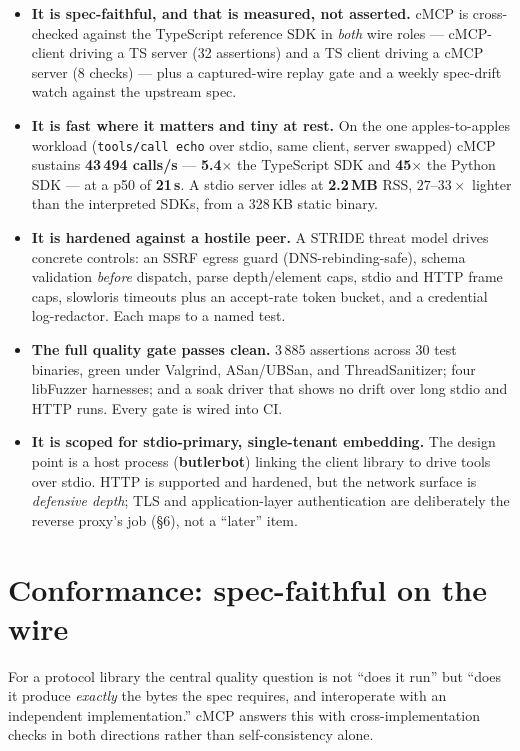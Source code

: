 \documentclass[10pt]{article}
\newcommand{\code}[1]{\texttt{\small #1}}
\begin{document}
\begin{itemize}
  \item \textbf{It is spec-faithful, and that is measured, not asserted.}
    cMCP is cross-checked against the TypeScript reference SDK in
    \emph{both} wire roles --- cMCP-client driving a TS server (32 assertions)
    and a TS client driving a cMCP server (8 checks) --- plus a captured-wire
    replay gate and a weekly spec-drift watch against the upstream spec.
  \item \textbf{It is fast where it matters and tiny at rest.} On the one
    apples-to-apples workload (\code{tools/call echo} over stdio, same client,
    server swapped) cMCP sustains \textbf{43\,494 calls/s} --- \textbf{5.4$\times$}
    the TypeScript SDK and \textbf{45$\times$} the Python SDK --- at a p50 of
    \textbf{21\,\textmu s}. A stdio server idles at \textbf{2.2\,MB} RSS, $27$--$33\times$
    lighter than the interpreted SDKs, from a 328\,KB static binary.
  \item \textbf{It is hardened against a hostile peer.} A STRIDE threat model
    drives concrete controls: an SSRF egress guard (DNS-rebinding-safe),
    schema validation \emph{before} dispatch, parse depth/element caps, stdio
    and HTTP frame caps, slowloris timeouts plus an accept-rate token bucket,
    and a credential log-redactor. Each maps to a named test.
  \item \textbf{The full quality gate passes clean.} 3\,885 assertions across
    30 test binaries, green under Valgrind, ASan/UBSan, and ThreadSanitizer;
    four libFuzzer harnesses; and a soak driver that shows no drift over long
    stdio and HTTP runs. Every gate is wired into CI.
  \item \textbf{It is scoped for stdio-primary, single-tenant embedding.}
    The design point is a host process (\textbf{butlerbot}) linking the client
    library to drive tools over stdio. HTTP is supported and hardened, but the
    network surface is \emph{defensive depth}; TLS and application-layer
    authentication are deliberately the reverse proxy's job (\S6), not a
    ``later'' item.
\end{itemize}

\section{Conformance: spec-faithful on the wire}

For a protocol library the central quality question is not ``does it run'' but
``does it produce \emph{exactly} the bytes the spec requires, and interoperate
with an independent implementation.'' cMCP answers this with cross-implementation
checks in both directions rather than self-consistency alone.
\end{document}
